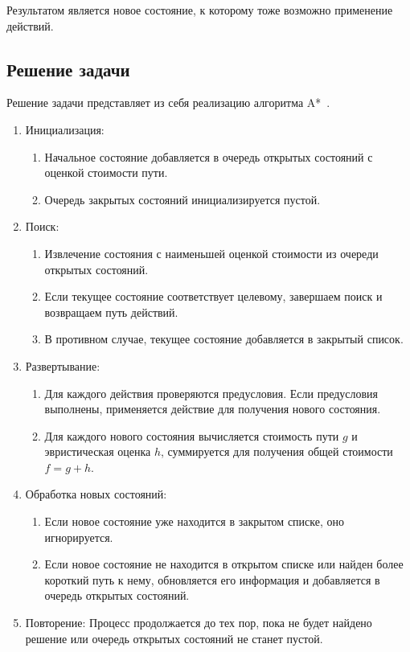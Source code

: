 \documentclass{article}
\begin{document}
Результатом является новое состояние, к которому тоже возможно применение действий.

\subsection{Решение задачи}

Решение задачи представляет из себя реализацию алгоритма A*~\cite{astar}.

\begin{enumerate}
  \item Инициализация:
    \begin{enumerate}
      \item Начальное состояние добавляется в очередь открытых состояний с оценкой стоимости пути.
      \item Очередь закрытых состояний инициализируется пустой.
    \end{enumerate}
  \item Поиск:
    \begin{enumerate}
      \item Извлечение состояния с наименьшей оценкой стоимости из очереди открытых состояний.
      \item Если текущее состояние соответствует целевому, завершаем поиск и возвращаем путь действий.
      \item В противном случае, текущее состояние добавляется в закрытый список.
    \end{enumerate}
  \item Развертывание:
    \begin{enumerate}
      \item Для каждого действия проверяются предусловия. Если предусловия выполнены, применяется действие для получения нового состояния.
      \item Для каждого нового состояния вычисляется стоимость пути $g$ и эвристическая оценка $h$, суммируется для получения общей стоимости $f = g + h$.
    \end{enumerate}
  \item Обработка новых состояний:
    \begin{enumerate}
      \item Если новое состояние уже находится в закрытом списке, оно игнорируется.
      \item Если новое состояние не находится в открытом списке или найден более короткий путь к нему, обновляется его информация и добавляется в очередь открытых состояний.
    \end{enumerate}
  \item Повторение: Процесс продолжается до тех пор, пока не будет найдено решение или очередь открытых состояний не станет пустой.
\end{enumerate}
\end{document}
